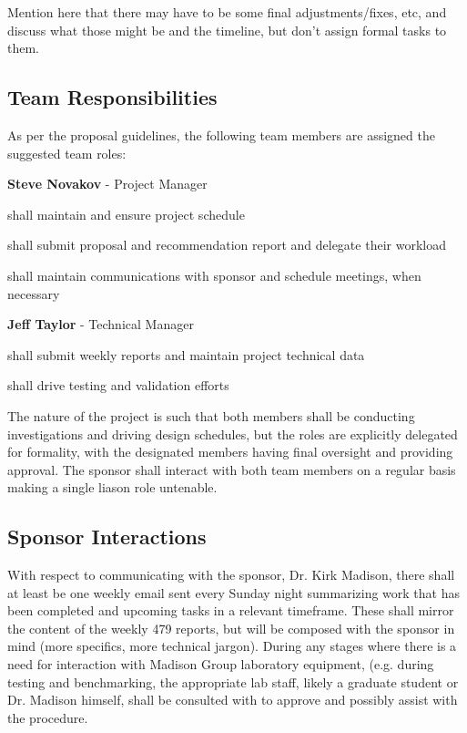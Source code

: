 Mention here that there may have to be some final adjustments/fixes, etc, and
discuss what those might be and the timeline, but don't assign formal tasks to
them.

\subsection{Team Responsibilities} %

As per the proposal guidelines, the following team members are assigned the
suggested team roles:
\begin{packed_itemize}
  \item{\textbf{Steve Novakov} - Project Manager}
    \begin{packed_itemize}
      \item shall maintain and ensure project schedule
      \item shall submit proposal and recommendation report and delegate their
      workload
      \item shall maintain communications with sponsor and schedule meetings,
      when necessary
    \end{packed_itemize}
  \item{\textbf{Jeff Taylor} - Technical Manager}
    \begin{packed_itemize}
      \item shall submit weekly reports and maintain project technical data
      \item shall drive testing and validation efforts
    \end{packed_itemize}
\end{packed_itemize}

The nature of the project is such that both members shall be conducting
investigations and driving design schedules, but the roles are explicitly
delegated for formality, with the designated members having final oversight
and providing approval. The sponsor shall interact with both team members on a
regular basis making a single liason role untenable.

\subsection{Sponsor Interactions}  %

With respect to communicating with the sponsor, Dr. Kirk Madison, there shall
at least be one weekly email sent every Sunday night summarizing work that has
been completed and upcoming tasks in a relevant timeframe. These shall mirror
the content of the weekly 479 reports, but will be composed with the sponsor in
mind (more specifics, more technical jargon). During any stages where there
is a need for interaction with Madison Group laboratory equipment, (e.g. during
testing and benchmarking, the appropriate lab staff, likely a graduate
student or Dr. Madison himself, shall be consulted with to approve and possibly
assist with the procedure.

